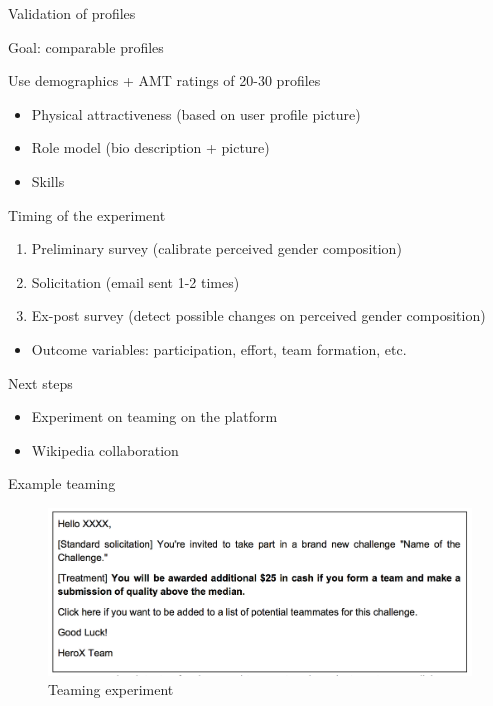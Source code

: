 \begin{frame}{Validation of profiles}

Goal: comparable profiles

Use demographics + AMT ratings of 20-30 profiles

\begin{itemize}
\tightlist
\item
  Physical attractiveness (based on user profile picture)
\item
  Role model (bio description + picture)
\item
  Skills
\end{itemize}

\end{frame}

\begin{frame}{Timing of the experiment}

\begin{enumerate}
\def\labelenumi{\arabic{enumi}.}
\tightlist
\item
  Preliminary survey (calibrate perceived gender composition)
\item
  Solicitation (email sent 1-2 times)
\item
  Ex-post survey (detect possible changes on perceived gender
  composition)
\end{enumerate}

\begin{itemize}
\tightlist
\item
  Outcome variables: participation, effort, team formation, etc.
\end{itemize}

\end{frame}

\begin{frame}{Next steps}

\begin{itemize}
\tightlist
\item
  Experiment on teaming on the platform
\item
  Wikipedia collaboration
\end{itemize}

\end{frame}

\begin{frame}{Example teaming}

\begin{figure}
\centering
\includegraphics{solicit_teaming.png}
\caption{Teaming experiment}
\end{figure}

\end{frame}


